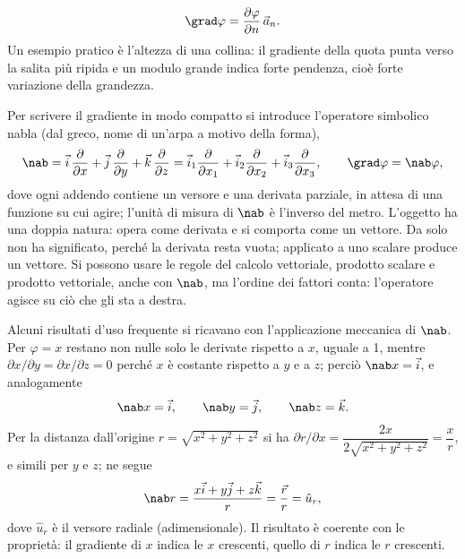 \documentclass[main.tex]{subfiles}
\begin{document}
\[
\grad\varphi=\frac{\partial\varphi}{\partial n}\,\vec a_n .
\]
Un esempio pratico è l'altezza di una collina: il gradiente della quota punta verso la salita più ripida e un modulo grande indica forte pendenza, cioè forte variazione della grandezza.

Per scrivere il gradiente in modo compatto si introduce l'operatore simbolico nabla (dal greco, nome di un'arpa a motivo della forma),
\[
\nab=\vec i\,\frac{\partial}{\partial x}+\vec j\,\frac{\partial}{\partial y}+\vec k\,\frac{\partial}{\partial z}=\vec i_1\frac{\partial}{\partial x_1}+\vec i_2\frac{\partial}{\partial x_2}+\vec i_3\frac{\partial}{\partial x_3},\qquad \grad\varphi=\nab\varphi ,
\]
dove ogni addendo contiene un versore e una derivata parziale, in attesa di una funzione su cui agire; l'unità di misura di $\nab$ è l'inverso del metro. L'oggetto ha una doppia natura: opera come derivata e si comporta come un vettore. Da solo non ha significato, perché la derivata resta vuota; applicato a uno scalare produce un vettore. Si possono usare le regole del calcolo vettoriale, prodotto scalare e prodotto vettoriale, anche con $\nab$, ma l'ordine dei fattori conta: l'operatore agisce su ciò che gli sta a destra.

Alcuni risultati d'uso frequente si ricavano con l'applicazione meccanica di $\nab$. Per $\varphi=x$ restano non nulle solo le derivate rispetto a $x$, uguale a 1, mentre $\partial x/\partial y=\partial x/\partial z=0$ perché $x$ è costante rispetto a $y$ e a $z$; perciò $\nab x=\vec i$, e analogamente
\[
\nab x=\vec i,\qquad\nab y=\vec j,\qquad\nab z=\vec k .
\]
Per la distanza dall'origine $r=\sqrt{x^2+y^2+z^2}$ si ha $\partial r/\partial x=\dfrac{2x}{2\sqrt{x^2+y^2+z^2}}=\dfrac xr$, e simili per $y$ e $z$; ne segue
\[
\nab r=\frac{x\vec i+y\vec j+z\vec k}{r}=\frac{\vec r}{r}=\hat u_r ,
\]
dove $\hat u_r$ è il versore radiale (adimensionale). Il risultato è coerente con le proprietà: il gradiente di $x$ indica le $x$ crescenti, quello di $r$ indica le $r$ crescenti.
\end{document}
